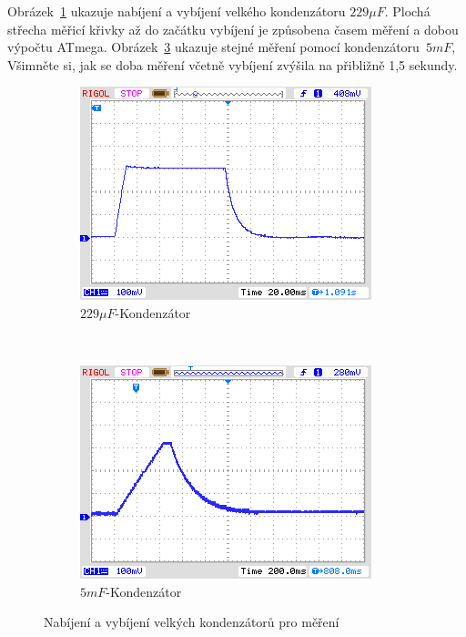 Obrázek~\ref{pic:c229} ukazuje nabíjení a vybíjení velkého kondenzátoru \(229\mu F\).
Plochá střecha měřicí křivky až do začátku vybíjení je způsobena časem měření a dobou výpočtu ATmega.
Obrázek~\ref{pic:c5mF} ukazuje stejné měření pomocí kondenzátoru~\(5mF\),
Všimněte si, jak se doba měření včetně vybíjení zvýšila na přibližně 1,5 sekundy.
\begin{figure}[H]
  \begin{subfigure}[b]{.5\textwidth}
    \centering
    \includegraphics[width=1.\textwidth]{../PNG/charge_229uF.png}
    \caption{\(229\mu F\)-Kondenzátor}
    \label{pic:c229}
  \end{subfigure}
  ~
  \begin{subfigure}[b]{.5\textwidth}
    \centering
    \includegraphics[width=1.\textwidth]{../PNG/charge_5mF.png}
    \caption{\(5mF\)-Kondenzátor}
    \label{pic:c5mF}
  \end{subfigure}
  \caption{Nabíjení a vybíjení velkých kondenzátorů pro měření}
\end{figure}
